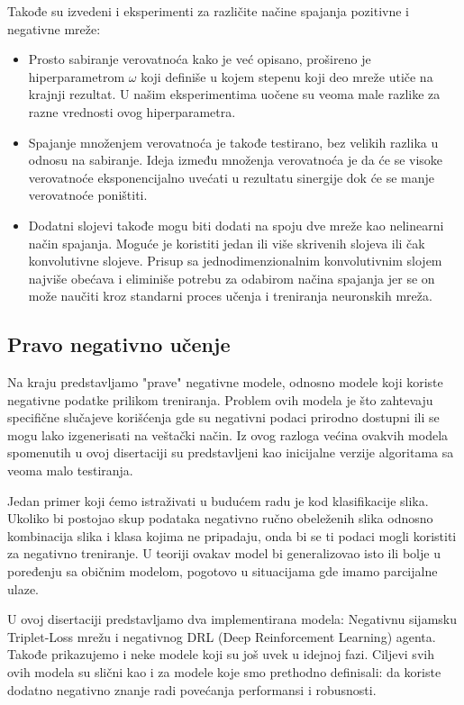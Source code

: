 Takođe su izvedeni i eksperimenti za različite načine spajanja pozitivne i negativne mreže:

\begin{itemize}
    \item Prosto sabiranje verovatnoća kako je već opisano, prošireno je hiperparametrom $ \omega $ koji definiše u kojem stepenu koji deo mreže utiče na krajnji rezultat. U našim eksperimentima uočene su veoma male razlike za razne vrednosti ovog hiperparametra.
    \item Spajanje množenjem verovatnoća je takođe testirano, bez velikih razlika u odnosu na sabiranje. Ideja između množenja verovatnoća je da će se visoke verovatnoće eksponencijalno uvećati u rezultatu sinergije dok će se manje verovatnoće poništiti.
    \item Dodatni slojevi takođe mogu biti dodati na spoju dve mreže kao nelinearni način spajanja. Moguće je koristiti jedan ili više skrivenih slojeva ili čak konvolutivne slojeve. Prisup sa jednodimenzionalnim konvolutivnim slojem najviše obećava i eliminiše potrebu za odabirom načina spajanja jer se on može naučiti kroz standarni proces učenja i treniranja neuronskih mreža. 
\end{itemize}

\subsection*{Pravo negativno učenje}

Na kraju predstavljamo "prave" negativne modele, odnosno modele koji koriste negativne podatke prilikom treniranja. Problem ovih modela je što zahtevaju specifične slučajeve korišćenja gde su negativni podaci prirodno dostupni ili se mogu lako izgenerisati na veštački način. Iz ovog razloga većina ovakvih modela spomenutih u ovoj disertaciji su predstavljeni kao inicijalne verzije algoritama sa veoma malo testiranja.

Jedan primer koji ćemo istraživati u budućem radu je kod klasifikacije slika. Ukoliko bi postojao skup podataka negativno ručno obeleženih slika odnosno kombinacija slika i klasa kojima ne pripadaju, onda bi se ti podaci mogli koristiti za negativno treniranje. U teoriji ovakav model bi generalizovao isto ili bolje u poređenju sa običnim modelom, pogotovo u situacijama gde imamo parcijalne ulaze.

U ovoj disertaciji predstavljamo dva implementirana modela: Negativnu sijamsku Triplet-Loss mrežu i negativnog DRL (Deep Reinforcement Learning) agenta. Takođe prikazujemo i neke modele koji su još uvek u idejnoj fazi. Ciljevi svih ovih modela su slični kao i za modele koje smo prethodno definisali: da koriste dodatno negativno znanje radi povećanja performansi i robusnosti.

